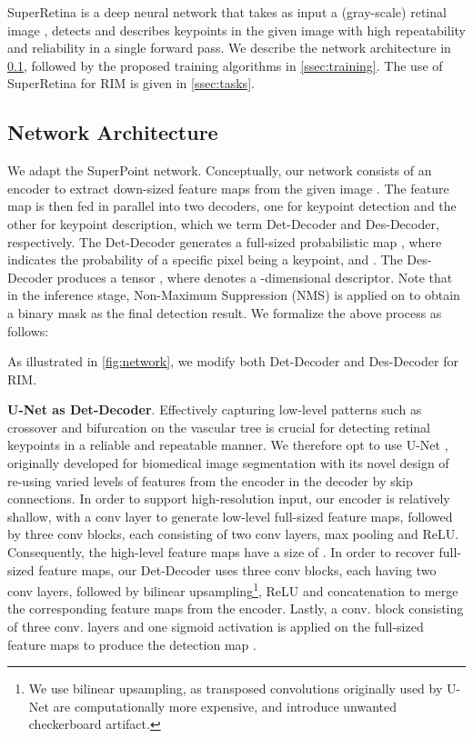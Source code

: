 
SuperRetina is a deep neural network that takes as input a (gray-scale)  retinal image , detects and describes keypoints in the given image with high repeatability and reliability in a single forward pass. We describe the network architecture in  \cref{ssec:network}, followed by the proposed  training algorithms in  \cref{ssec:training}. The use of SuperRetina for RIM is given in \cref{ssec:tasks}.

\subsection{Network Architecture} \label{ssec:network}

We adapt the SuperPoint network. Conceptually, our network consists of an encoder to extract down-sized feature maps  from the given image . The feature map is then fed in parallel into two decoders, one for keypoint detection and the other for keypoint description, which we term Det-Decoder and Des-Decoder, respectively. The Det-Decoder generates a full-sized probabilistic map , where  indicates the probability of a specific pixel being a keypoint,  and . The Des-Decoder produces a  tensor , where  denotes a -dimensional descriptor. Note that in the inference stage, Non-Maximum Suppression (NMS) is applied on  to obtain a binary mask  as the final detection result.  We formalize the above process as follows:

As illustrated in  \cref{fig:network}, we modify both Det-Decoder and Des-Decoder for RIM.

\textbf{U-Net as Det-Decoder}. 
Effectively capturing low-level patterns such as crossover and bifurcation on the vascular tree is crucial for detecting retinal keypoints in a reliable and repeatable manner. We therefore opt to use U-Net \cite{ronneberger2015u}, originally developed for biomedical image segmentation with its novel design of re-using varied levels of features from the encoder in the decoder by skip connections. In order to support high-resolution input, our encoder is relatively shallow, with a conv layer to generate low-level full-sized feature maps, followed by three conv blocks, each consisting of two conv layers,  max pooling and ReLU. Consequently, the high-level feature maps  have a size of .  In order to recover full-sized feature maps, our Det-Decoder uses three conv blocks, each having two conv layers, followed by bilinear upsampling\footnote{We use bilinear upsampling, as transposed convolutions originally used by U-Net are  computationally more expensive, and introduce unwanted checkerboard artifact\cite{M2U-Net}.}, ReLU and concatenation to merge the corresponding feature maps from the encoder. Lastly, a conv. block consisting of three conv. layers and one sigmoid activation is applied on the full-sized feature maps to produce the  detection map . 




